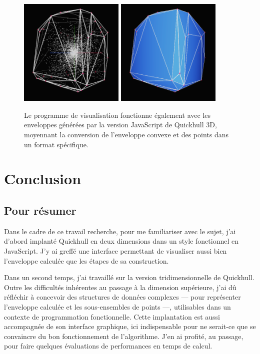 \documentclass[]{article}
\begin{document}
\begin{figure}[H]
	\begin{center}
		\includegraphics[width=5cm]{illus/illus1.png}
		\includegraphics[width=5cm]{illus/illus2.png}
	\end{center}
	\caption{Le programme de visualisation fonctionne également avec les enveloppes générées par la version JavaScript de Quickhull 3D, moyennant la conversion de l'enveloppe convexe et des points dans un format spécifique.}
\end{figure}

\pagebreak
\section{Conclusion}
\subsection{Pour résumer}
Dans le cadre de ce travail recherche, pour me familiariser avec le sujet, j'ai d'abord implanté Quickhull en deux dimensions dans un style fonctionnel en JavaScript. J'y ai greffé une interface permettant de visualiser aussi bien l'enveloppe calculée que les étapes de sa construction.

Dans un second temps, j'ai travaillé sur la version tridimensionnelle de Quickhull. Outre les difficultés inhérentes au passage à la dimension supérieure, j'ai dû réfléchir à concevoir des structures de données complexes — pour représenter l'enveloppe calculée et les sous-ensembles de points —, utilisables dans un contexte de programmation fonctionnelle. Cette implantation est aussi accompagnée de son interface graphique, ici indispensable pour ne serait-ce que se convaincre du bon fonctionnement de l'algorithme. J'en ai profité, au passage, pour faire quelques évaluations de performances en temps de calcul.
\end{document}

